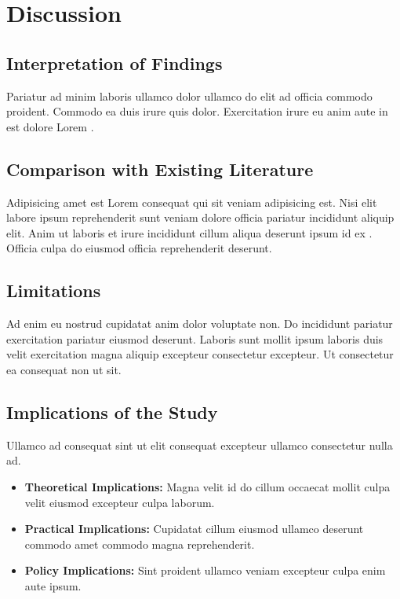\section{Discussion}

\subsection{Interpretation of Findings}
Pariatur ad minim laboris ullamco dolor ullamco do elit ad officia commodo proident. Commodo ea duis irure quis dolor. Exercitation irure eu anim aute in est dolore Lorem \parencite{placeholderConference2023}.

\subsection{Comparison with Existing Literature}
Adipisicing amet est Lorem consequat qui sit veniam adipisicing est. Nisi elit labore ipsum reprehenderit sunt veniam dolore officia pariatur incididunt aliquip elit. Anim ut laboris et irure incididunt cillum aliqua deserunt ipsum id ex \textcite{placeholderArticle2023}. Officia culpa do eiusmod officia reprehenderit deserunt.

\subsection{Limitations}
Ad enim eu nostrud cupidatat anim dolor voluptate non. Do incididunt pariatur exercitation pariatur eiusmod deserunt. Laboris sunt mollit ipsum laboris duis velit exercitation magna aliquip excepteur consectetur excepteur. Ut consectetur ea consequat non ut sit.

\subsection{Implications of the Study}
Ullamco ad consequat sint ut elit consequat excepteur ullamco consectetur nulla ad.
\begin{itemize}
  \item \textbf{Theoretical Implications:} Magna velit id do cillum occaecat mollit culpa velit eiusmod excepteur culpa laborum.
  \item \textbf{Practical Implications:} Cupidatat cillum eiusmod ullamco deserunt commodo amet commodo magna reprehenderit.
  \item \textbf{Policy Implications:} Sint proident ullamco veniam excepteur culpa enim aute ipsum.
\end{itemize}

